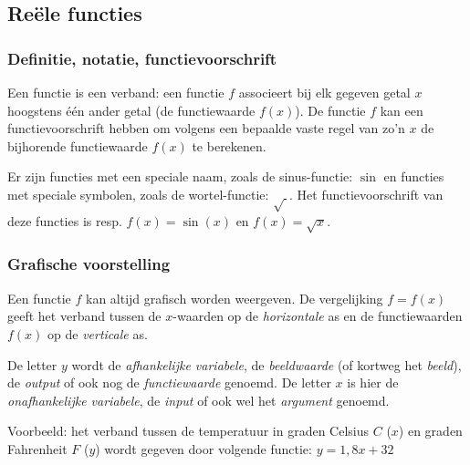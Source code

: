 \subsection{Re\"ele functies}

\subsubsection{Definitie, notatie, functievoorschrift}

\begin{definitie}
	
Een functie is een verband: een functie $f$  associeert bij elk gegeven getal $x$ hoogstens \'e\'en ander getal (de functiewaarde $f(x)$). De functie $f$ kan een functievoorschrift hebben om volgens een bepaalde vaste regel van zo'n $x$ de bijhorende functiewaarde $f(x)$ te berekenen.

\end{definitie}

Er zijn functies met een speciale naam, zoals de sinus-functie: $\sin$ en functies met speciale symbolen, zoals de wortel-functie: $\sqrt{\ }$. Het functievoorschrift van deze functies is resp. $f(x)=\sin(x)$ en $f(x)=\sqrt{x}$.

\subsubsection{Grafische voorstelling}

\begin{definitie}
	Een functie $f$  kan altijd grafisch worden weergeven. De vergelijking $f=f(x)$  geeft het verband tussen de $x$-waarden op de \emph{horizontale} as en de functiewaarden $f(x)$ op de \emph{verticale} as.
\end{definitie}

De letter $y$ wordt de \emph{afhankelijke variabele}, de
\emph{beeldwaarde} (of kortweg het \emph{beeld}), de \emph{output}
of ook nog de \emph{functiewaarde} genoemd. 
De letter $x$ is hier
de \emph{onafhankelijke variabele}, de \emph{input} of ook wel het
\emph{argument} genoemd. 

Voorbeeld: het verband tussen de temperatuur in graden
Celsius \textdegree$C$ ($x$) en graden Fahrenheit \textdegree$F$ ($y$)
wordt gegeven door volgende functie: $y=1,8x+32$



